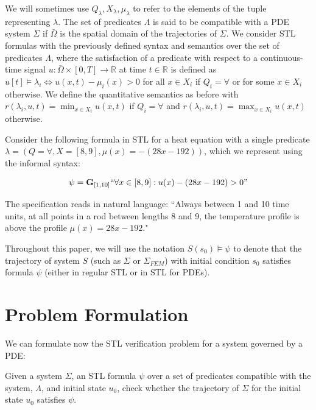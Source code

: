 \documentclass[oribibl]{llncs/llncs}
\newcommand*{\R}{\mathbb{R}}
\newcommand{\Always}{\mathbf{G}}
\begin{document}
We will sometimes use $Q_\lambda, X_\lambda, \mu_\lambda$ to refer to the
elements of the tuple representing $\lambda$. The set of predicates $\Lambda$ is
said to be compatible with a PDE system $\Sigma$ if $\bar\Omega$ is the spatial
domain of the trajectories of $\Sigma$. We consider STL formulas 
with the previously defined syntax and semantics 
over the set of predicates $\Lambda$, where the satisfaction of a
predicate with respect to a continuous-time signal $u : \bar\Omega \times [0, T]
\to \R$ at time $t \in \R$ is defined as $u[t] \models \lambda_i \iff 
u(x, t) - \mu_i(x) > 0$ for all $x \in X_i$ if $Q_i = \forall$ or for some $x \in
X_i$ otherwise. We define the quantitative semantics as before with
$r(\lambda_i,u, t) = \min_{x \in X_i} u(x, t)$ if $Q_i = \forall$ and
$r(\lambda_i,u, t) = \max_{x \in X_i} u(x, t)$ otherwise.

\begin{example}
    \label{ex:stl}

    Consider the following formula in STL for a heat equation with a single predicate
    $\lambda = (Q = \forall, X = [8, 9], \mu(x) = -(28x - 192))$, which we 
    represent using the informal syntax:

    \begin{equation}
        \psi = \Always_{[1,10]} ``\forall x \in [8,9] : u(x) - (28x - 192) > 0"
    \end{equation}

    The specification reads in natural language: ``Always between 1 and 10 time
    units, at all points in a rod between lengths 8 and 9, the temperature
    profile is above the profile $\mu(x) = 28x - 192$."

\end{example}

Throughout this paper, we will use the notation $S(s_0) \models \psi$ to denote
that the trajectory of system $S$ (such as $\Sigma$ or $\Sigma_{FEM}$) with
initial condition $s_0$ satisfies formula $\psi$ (either in regular STL or in
STL for PDEs).

\section{Problem Formulation}
\label{sec:problem_formulation}

We can formulate now the STL verification problem for a system governed by a
PDE:

\begin{problem}
\label{pr:stl}
    Given a system $\Sigma$, an STL formula $\psi$ over a set of predicates
    compatible with the system, $\Lambda$, and initial state $u_0$,
    check whether the trajectory of $\Sigma$ for the initial state $u_0$
    satisfies $\psi$.
\end{problem}
\end{document}
